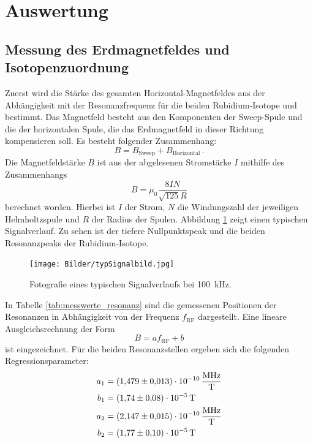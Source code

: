 \section{Auswertung}
\subsection{Messung des Erdmagnetfeldes und Isotopenzuordnung}
Zuerst wird die Stärke des gesamten Horizontal-Magnetfeldes aus der Abhängigkeit mit der Resonanzfrequenz für die beiden Rubidium-Isotope  und  bestimmt.
Das Magnetfeld besteht aus den Komponenten der Sweep-Spule und die der horizontalen Spule, die das Erdmagnetfeld in dieser Richtung kompensieren soll. Es besteht folgender Zusammenhang:
\begin{equation}
  B=B_\text{Sweep}+B_\text{Horizontal}\,.
\end{equation}
Die Magnetfeldstärke $B$ ist aus der abgelesenen Stromstärke $I$ mithilfe des Zusammenhangs
\begin{equation}
B=\mu_0\frac{8IN}{\sqrt{125}R}
\end{equation}
berechnet worden. Hierbei ist $I$ der Strom, $N$ die Windungszahl der jeweiligen Helmholtzspule und $R$ der Radius der Spulen.
Abbildung \ref{fig:typSignalbild} zeigt einen typischen Signalverlauf. Zu sehen ist der tiefere Nullpunktspeak und die beiden Resonanzpeaks der Rubidium-Isotope.
\begin{figure}[H]
  \centering
  \texttt{[image: Bilder/typSignalbild.jpg]}
  \caption{Fotografie eines typischen Signalverlaufs bei \SI{100}{kHz}.}
  \label{fig:typSignalbild}
\end{figure}
In Tabelle \ref{tab:messwerte_resonanz} sind die gemessenen Positionen der Resonanzen in Abhängigkeit von der Frequenz $f_\text{RF}$ dargestellt. Eine lineare Ausgleichsrechnung der Form
\begin{equation}
  B=af_\text{RF}+b
\end{equation}
ist eingezeichnet.
Für die beiden Resonanzstellen ergeben sich die folgenden Regressionsparameter:
\begin{align*}
  a_1 &= \SI{1,479 \pm 0,013 e-10}{\frac{MHz}{T}} \\
  b_1 &= \SI{1,74 \pm 0,08 e-5}{T}\\
  a_2 &= \SI{2,147 \pm 0,015 e-10}{\frac{MHz}{T}} \\
  b_2 &= \SI{1,77 \pm 0,10 e-5}{T}\\
\end{align*}
